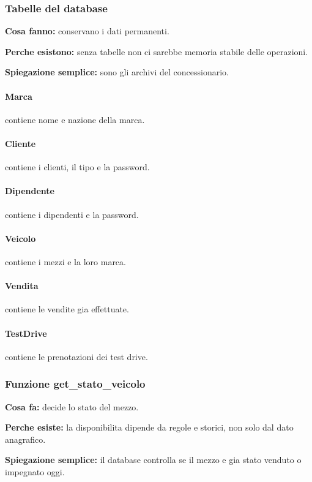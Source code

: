\documentclass[12pt,a4paper]{article}
\begin{document}
\subsubsection*{Tabelle del database}
\textbf{Cosa fanno:} conservano i dati permanenti.

\textbf{Perche esistono:} senza tabelle non ci sarebbe memoria stabile delle operazioni.

\textbf{Spiegazione semplice:} sono gli archivi del concessionario.

\paragraph{Marca}
contiene nome e nazione della marca.

\paragraph{Cliente}
contiene i clienti, il tipo e la password.

\paragraph{Dipendente}
contiene i dipendenti e la password.

\paragraph{Veicolo}
contiene i mezzi e la loro marca.

\paragraph{Vendita}
contiene le vendite gia effettuate.

\paragraph{TestDrive}
contiene le prenotazioni dei test drive.

\subsubsection*{Funzione get\_stato\_veicolo}
\textbf{Cosa fa:} decide lo stato del mezzo.

\textbf{Perche esiste:} la disponibilita dipende da regole e storici, non solo dal dato anagrafico.

\textbf{Spiegazione semplice:} il database controlla se il mezzo e gia stato venduto o impegnato oggi.
\end{document}
